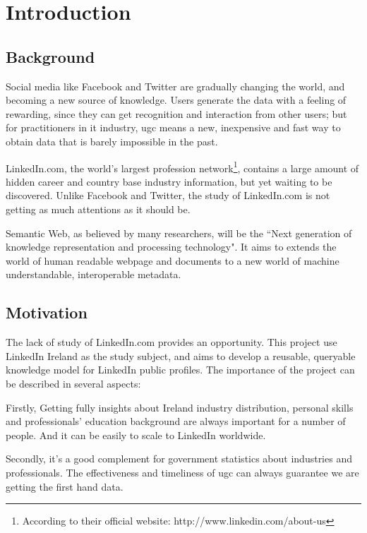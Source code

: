 \chapter{Introduction}

\section{Background}
Social media like Facebook and Twitter are gradually changing the world, and becoming a new source of knowledge. Users generate the data with a feeling of rewarding, since they can get recognition and interaction from other users\cite{krumm2008user}; but for practitioners in \gls{it} industry, \gls{ugc} means a new, inexpensive and fast way to obtain data that is barely impossible in the past.

LinkedIn.com, the world's largest profession network\footnote{According to their official website: http://www.linkedin.com/about-us}, contains a large amount of hidden career and country base industry information, but yet waiting to be discovered. Unlike Facebook and Twitter, the study of LinkedIn.com is not getting as much attentions as it should be. 

Semantic Web, as believed by many researchers, will be the ``Next generation of  knowledge representation and processing technology"\cite{shadbolt2006}. It aims to extends the world of human readable webpage and documents to a new world of machine understandable, interoperable metadata.

\section{Motivation}
The lack of study of LinkedIn.com provides an opportunity. This project use LinkedIn Ireland as the study subject, and aims to develop a reusable, queryable knowledge model for LinkedIn public profiles. The importance of the project can be described in several aspects:

Firstly, Getting fully insights about Ireland industry distribution, personal skills and professionals' education background are always important for a number of people. And it can be easily to scale to LinkedIn worldwide.

Secondly, it's a good complement for government statistics about industries and professionals. The effectiveness and timeliness of \acrshort{ugc} can always guarantee we are getting the first hand data.

